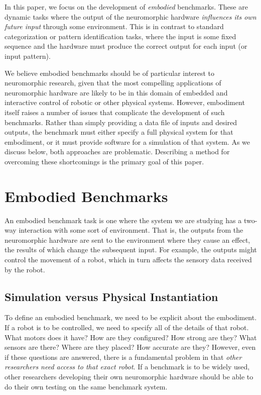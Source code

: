\documentclass{frontiersSCNS} %
\begin{document}
In this paper, we focus on the development of \emph{embodied} benchmarks.
These are dynamic tasks where the output of the neuromorphic hardware \emph{influences
its own future input} through some environment.  This is in contrast to standard categorization or pattern
identification tasks, where the input is some fixed sequence and the hardware
must produce the correct output for each input (or input pattern).

We believe embodied benchmarks should be of particular interest to
neuromorphic research, given that the most compelling applications of neuromorphic
hardware are likely to be in this domain of embedded and interactive control
of robotic or other physical systems.  However, embodiment itself raises a number
of issues that complicate the development of such benchmarks.  Rather than
simply providing a data file of inputs and desired outputs, the benchmark
must either specify a full physical system for that embodiment, or it must 
provide software for a simulation of that system.  As we discuss below, both
approaches are problematic.  
Describing a method for overcoming these shortcomings is the primary goal of
this paper.


\section{Embodied Benchmarks}

An embodied benchmark task is one where the system we are studying has a 
two-way interaction with some sort of environment.  That is, the outputs from
the neuromorphic hardware are sent to the environment where they cause
an effect, the results of which change the subsequent input.  For example,
the outputs might control the movement of a robot, which in turn affects the
sensory data received by the robot.

\subsection{Simulation versus Physical Instantiation}

To define an embodied benchmark, we need to be explicit about the embodiment.  If
a robot is to be controlled, we need to specify all of the details of that robot.  What motors does it have?  How are they
configured?  How strong are they?  What sensors are there?  Where are they
placed?  How accurate are they?  However, even if these questions are
answered, there is a fundamental problem in that \emph{other researchers
need access to that exact robot}.  If a benchmark is to be widely used, other
researchers developing their own neuromorphic hardware should be able to do their own 
testing on the same benchmark system.
\end{document}
